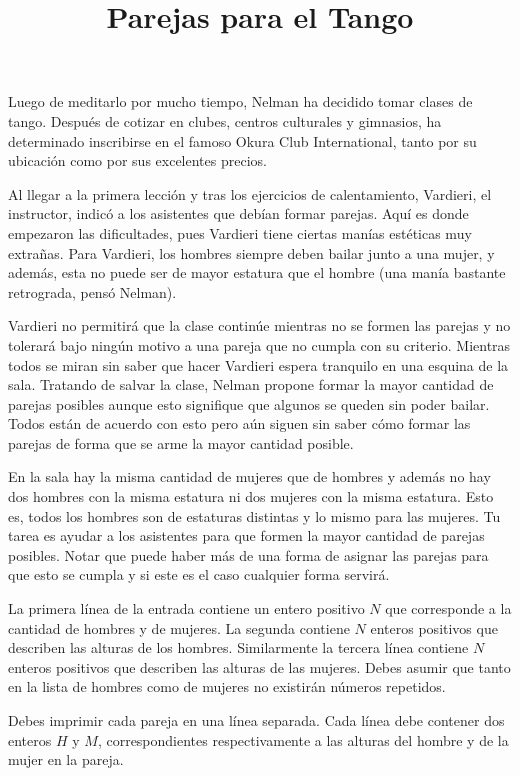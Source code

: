 \documentclass{oci}
\title{Parejas para el Tango}
\begin{document}
\begin{problemDescription}
Luego de meditarlo por mucho tiempo, Nelman ha decidido tomar clases de tango.
Después de cotizar en clubes, centros culturales y gimnasios, ha determinado inscribirse en el famoso Okura Club International, tanto por su ubicación como por sus excelentes precios.

Al llegar a la primera lección y tras los ejercicios de calentamiento, Vardieri, el instructor, indicó a los asistentes que debían formar parejas.
Aquí es donde empezaron las dificultades, pues Vardieri tiene ciertas manías estéticas muy extrañas.
Para Vardieri, los hombres siempre deben bailar junto a una mujer, y además, esta no puede ser de mayor estatura que el hombre (una manía bastante retrograda, pensó Nelman).

Vardieri no permitirá que la clase continúe mientras no se formen las parejas y no tolerará bajo ningún motivo a una pareja que no cumpla con su criterio.
Mientras todos se miran sin saber que hacer Vardieri espera tranquilo en una esquina de la sala.
Tratando de salvar la clase, Nelman propone formar la mayor cantidad de parejas posibles aunque esto signifique que algunos se queden sin poder bailar.
Todos están de acuerdo con esto pero aún siguen sin saber cómo formar las parejas de forma que se arme la mayor cantidad posible.

En la sala hay la misma cantidad de mujeres que de hombres y además no hay dos hombres con la misma estatura ni dos mujeres con la misma estatura.
Esto es, todos los hombres son de estaturas distintas y lo mismo para las mujeres.
Tu tarea es ayudar a los asistentes para que formen la mayor cantidad de parejas posibles.
Notar que puede haber más de una forma de asignar las parejas para que esto se cumpla y si este es el caso cualquier forma servirá.

\end{problemDescription}

\begin{inputDescription}
La primera línea de la entrada contiene un entero positivo $N$ que corresponde a la cantidad de hombres y de mujeres.
La segunda contiene $N$ enteros positivos que describen las alturas de los hombres.
Similarmente la tercera línea contiene $N$ enteros positivos que describen las alturas de las mujeres.
Debes asumir que tanto en la lista de hombres como de mujeres no existirán números repetidos.
\end{inputDescription}

\begin{outputDescription}
Debes imprimir cada pareja en una línea separada.
Cada línea debe contener dos enteros $H$ y $M$, correspondientes respectivamente a las alturas del hombre y de la mujer en la pareja.
\end{outputDescription}
\end{document}
